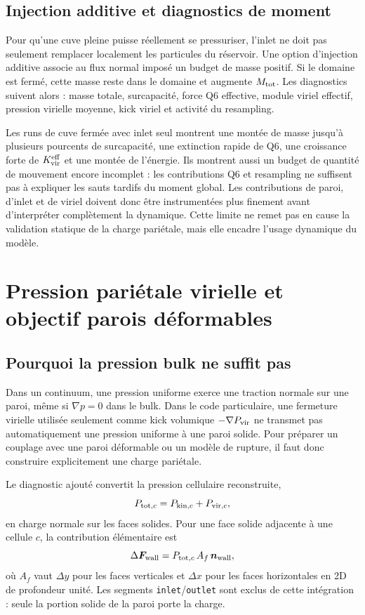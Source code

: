 \documentclass[11pt,a4paper]{article}
\begin{document}
\subsection{Injection additive et diagnostics de moment}

Pour qu'une cuve pleine puisse réellement se pressuriser, l'inlet ne doit pas seulement remplacer localement les particules du réservoir. Une option d'injection additive associe au flux normal imposé un budget de masse positif. Si le domaine est fermé, cette masse reste dans le domaine et augmente \(M_{\rm tot}\). Les diagnostics suivent alors : masse totale, surcapacité, force Q6 effective, module viriel effectif, pression virielle moyenne, kick viriel et activité du resampling.

Les runs de cuve fermée avec inlet seul montrent une montée de masse jusqu'à plusieurs pourcents de surcapacité, une extinction rapide de Q6, une croissance forte de \(K_{\rm vir}^{\rm eff}\) et une montée de l'énergie. Ils montrent aussi un budget de quantité de mouvement encore incomplet : les contributions Q6 et resampling ne suffisent pas à expliquer les sauts tardifs du moment global. Les contributions de paroi, d'inlet et de viriel doivent donc être instrumentées plus finement avant d'interpréter complètement la dynamique. Cette limite ne remet pas en cause la validation statique de la charge pariétale, mais elle encadre l'usage dynamique du modèle.

\section{Pression pariétale virielle et objectif parois déformables}

\subsection{Pourquoi la pression bulk ne suffit pas}

Dans un continuum, une pression uniforme exerce une traction normale sur une paroi, même si \(\nabla p=0\) dans le bulk. Dans le code particulaire, une fermeture virielle utilisée seulement comme kick volumique \(-\nabla P_{\rm vir}\) ne transmet pas automatiquement une pression uniforme à une paroi solide. Pour préparer un couplage avec une paroi déformable ou un modèle de rupture, il faut donc construire explicitement une charge pariétale.

Le diagnostic ajouté convertit la pression cellulaire reconstruite,
\begin{equation}
  P_{{\rm tot},c}=P_{{\rm kin},c}+P_{{\rm vir},c},
\end{equation}
en charge normale sur les faces solides. Pour une face solide adjacente à une cellule \(c\), la contribution élémentaire est
\begin{equation}
  \Delta \bm{F}_{\rm wall} = P_{{\rm tot},c}\,A_f\,\bm{n}_{\rm wall},
\end{equation}
où \(A_f\) vaut \(\Delta y\) pour les faces verticales et \(\Delta x\) pour les faces horizontales en 2D de profondeur unité. Les segments \texttt{inlet}/\texttt{outlet} sont exclus de cette intégration : seule la portion solide de la paroi porte la charge.
\end{document}
